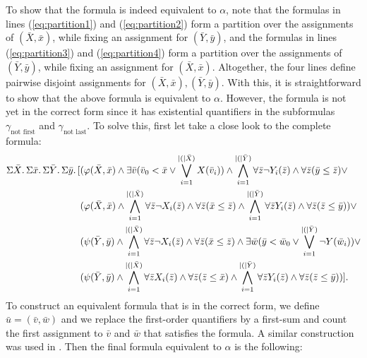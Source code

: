 To show that the formula is indeed equivalent to $\alpha$, note that the formulas in lines (\ref{eq:partition1}) and (\ref{eq:partition2}) form a partition over the assignments of $(\bar{X},\bar{x})$, while fixing an assignment for $(\bar{Y},\bar{y})$, and the formulas in lines (\ref{eq:partition3}) and (\ref{eq:partition4}) form a partition over the assignments of $(\bar{Y},\bar{y})$, while fixing an assignment for $(\bar{X},\bar{x})$. Altogether, the four lines define pairwise disjoint assignments for $(\bar{X},\bar{x}),(\bar{Y},\bar{y})$. With this, it is straightforward to show that the above formula is equivalent to $\alpha$. However, the formula is not yet in the correct form since it has existential quantifiers in the subformulas $\gamma_{\text{not first}}$ and $\gamma_{\text{not last}}$. To solve this, first let take a close look to the complete formula:
\begin{align*}
\Sigma{\bar{X}}.\,\Sigma{\bar{x}}.\,\Sigma{\bar{Y}}.\,\Sigma{\bar{y}}.\,[&(\varphi(\bar{X},\bar{x})\wedge\exists\bar{v}(\bar{v}_0 < \bar{x} \vee \bigvee_{i = 1}^{\vert ( \vert\bar{X})}X(\bar{v}_i))\wedge\bigwedge_{i = 1}^{\vert ( \vert\bar{Y})} \forall\bar{z}\neg Y_i(\bar{z}) \wedge \forall\bar{z}(\bar{y}\leq\bar{z})\vee\\
&(\varphi(\bar{X},\bar{x})\wedge\bigwedge_{i = 1}^{\vert ( \vert\bar{X})} \forall\bar{z}\neg X_i(\bar{z}) \wedge \forall\bar{z}(\bar{x}\leq\bar{z})\wedge\bigwedge_{i = 1}^{\vert ( \vert\bar{Y})} \forall\bar{z} Y_i(\bar{z}) \wedge \forall\bar{z}(\bar{z}\leq\bar{y}))\vee\\
&(\psi(\bar{Y},\bar{y})\wedge\bigwedge_{i = 1}^{\vert ( \vert\bar{X})} \forall\bar{z}\neg X_i(\bar{z}) \wedge \forall\bar{z}(\bar{x}\leq\bar{z})\wedge\exists\bar{w}(\bar{y} < \bar{w}_0 \vee \bigvee_{i = 1}^{\vert ( \vert\bar{Y})}\neg Y(\bar{w}_i))\vee\\
&(\psi(\bar{Y},\bar{y})\wedge\bigwedge_{i = 1}^{\vert ( \vert\bar{X})} \forall\bar{z} X_i(\bar{z}) \wedge \forall\bar{z}(\bar{z}\leq\bar{x})\wedge\bigwedge_{i = 1}^{\vert ( \vert\bar{Y})} \forall\bar{z} Y_i(\bar{z}) \wedge \forall\bar{z}(\bar{z}\leq\bar{y}))].
\end{align*}
To construct an equivalent formula that is in the correct form, we define $\bar{u} = (\bar{v},\bar{w})$ and we replace the first-order quantifiers by a first-sum and count the first assignment to $\bar{v}$ and $\bar{w}$ that satisfies the formula. A similar construction was used in \cite{SalujaST95}. Then the final formula equivalent to $\alpha$ is the following:
